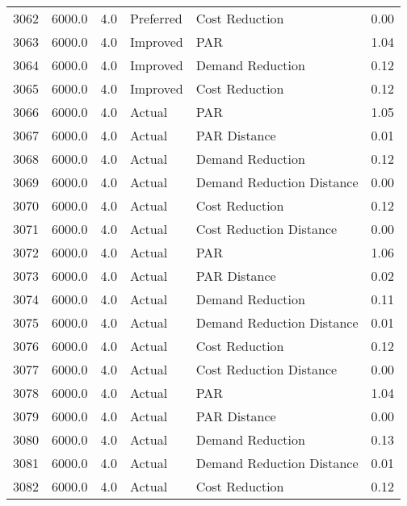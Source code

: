 \begin{longtable}{lrrllr}
3062 &       6000.0 &     4.0 &      Preferred &             Cost Reduction &   0.00 \\
3063 &       6000.0 &     4.0 &       Improved &                        PAR &   1.04 \\
3064 &       6000.0 &     4.0 &       Improved &           Demand Reduction &   0.12 \\
3065 &       6000.0 &     4.0 &       Improved &             Cost Reduction &   0.12 \\
3066 &       6000.0 &     4.0 &         Actual &                        PAR &   1.05 \\
3067 &       6000.0 &     4.0 &         Actual &               PAR Distance &   0.01 \\
3068 &       6000.0 &     4.0 &         Actual &           Demand Reduction &   0.12 \\
3069 &       6000.0 &     4.0 &         Actual &  Demand Reduction Distance &   0.00 \\
3070 &       6000.0 &     4.0 &         Actual &             Cost Reduction &   0.12 \\
3071 &       6000.0 &     4.0 &         Actual &    Cost Reduction Distance &   0.00 \\
3072 &       6000.0 &     4.0 &         Actual &                        PAR &   1.06 \\
3073 &       6000.0 &     4.0 &         Actual &               PAR Distance &   0.02 \\
3074 &       6000.0 &     4.0 &         Actual &           Demand Reduction &   0.11 \\
3075 &       6000.0 &     4.0 &         Actual &  Demand Reduction Distance &   0.01 \\
3076 &       6000.0 &     4.0 &         Actual &             Cost Reduction &   0.12 \\
3077 &       6000.0 &     4.0 &         Actual &    Cost Reduction Distance &   0.00 \\
3078 &       6000.0 &     4.0 &         Actual &                        PAR &   1.04 \\
3079 &       6000.0 &     4.0 &         Actual &               PAR Distance &   0.00 \\
3080 &       6000.0 &     4.0 &         Actual &           Demand Reduction &   0.13 \\
3081 &       6000.0 &     4.0 &         Actual &  Demand Reduction Distance &   0.01 \\
3082 &       6000.0 &     4.0 &         Actual &             Cost Reduction &   0.12 \\

\end{longtable}
